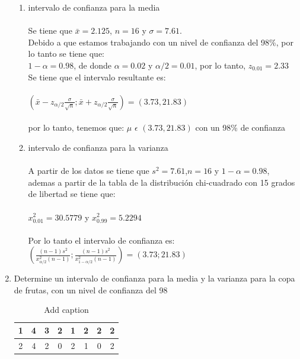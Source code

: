 \documentclass{article}
\begin{document}
\begin{enumerate}
    \begin{enumerate}{}
       
        \item{intervalo de confianza para la media}
            \paragraph{}Se tiene que $\bar{x}=2.125$, $n=16$ y $\sigma=7.61$.\\
            Debido a que estamos trabajando con un nivel de confianza del 98\%, por lo tanto se tiene que:\\ 
            $1-\alpha=0.98$, de donde $\alpha=0.02 $ y $\alpha/2=0.01$, por lo tanto, $z_{0.01}=2.33$ 
            Se tiene que el intervalo resultante es: \\\\
            $(\bar{x}-z_{\alpha/2}\frac{\sigma}{\sqrt{n}};\bar{x}+z_{\alpha/2}\frac{\sigma}{\sqrt{n}})=(3.73,21.83)$\\\\
            por lo tanto, tenemos que: $\mu$ $\epsilon$ $(3.73,21.83)$ con un 98\% de confianza
        

        \item {intervalo de confianza para la varianza}
        \paragraph{} A partir de los datos se tiene que $s^2=7.61$,$n=16$ y $1-\alpha=0.98$, ademas a partir de la tabla de la distribución chi-cuadrado con 15 grados de libertad se tiene que: \\\\
        $x_{0.01}^2=30.5779$ y $x_{0.99}^2=5.2294$ \\\\
        Por lo tanto el intervalo de confianza es: $(\frac{(n-1)s^2}{x_{\alpha/2}^2(n-1)};\frac{(n-1)s^2}{x_{1-\alpha/2}^2(n-1)})=(3.73;21.83)$ 
        
    \end{enumerate}
    \item Determine un intervalo de confianza para la media y la varianza para la copa de frutas, con un nivel de confianza del 98%
\begin{table}[htbp]
    \centering
    \caption{Add caption}
      \begin{tabular}{|c|c|c|c|c|c|c|c|}
      \toprule
      1     & 4     & 3     & 2     & 1     & 2     & 2     & 2 \\
      \midrule
      2     & 4     & 2     & 0     & 2     & 1     & 0     & 2 \\
      \bottomrule
      \end{tabular}%
    \label{tab:addlabel}%
  \end{table}%
  

\end{enumerate}
\end{document}
